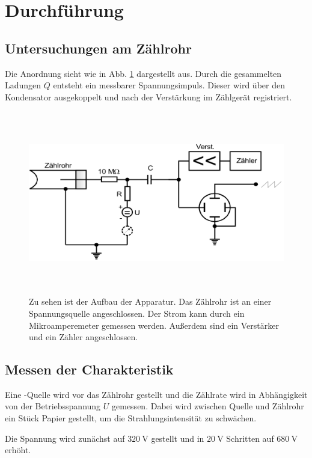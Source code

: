 \section{Durchführung}
\label{sec:Durchführung}

\subsection{Untersuchungen am Zählrohr}

Die Anordnung sieht wie in Abb. \ref{fig:aufbau} dargestellt aus. Durch die gesammelten Ladungen $Q$ entsteht ein messbarer Spannungsimpuls. Dieser wird über den Kondensator ausgekoppelt und nach der Verstärkung im Zählgerät registriert.

\begin{figure}
    \centering
    \includegraphics[width=12cm, height=8cm]{build/aufbau.png}
    \caption{Zu sehen ist der Aufbau der Apparatur. Das Zählrohr ist an einer Spannungsquelle angeschlossen. Der Strom kann durch ein Mikroamperemeter gemessen werden. Außerdem sind ein Verstärker und ein Zähler angeschlossen. \cite{V703}}
    \label{fig:aufbau}
\end{figure}

\subsection{Messen der Charakteristik}
Eine \beta-Quelle wird vor das Zählrohr gestellt und die Zählrate wird in Abhängigkeit von der Betriebsspannung $U$ gemessen. Dabei wird zwischen Quelle und Zählrohr ein Stück Papier gestellt, um die Strahlungsintensität zu schwächen.

\noindent Die Spannung wird zunächst auf $\SI{320}{\volt}$ gestellt und in $\SI{20}{\volt}$ Schritten auf $\SI{680}{\volt}$ erhöht.

